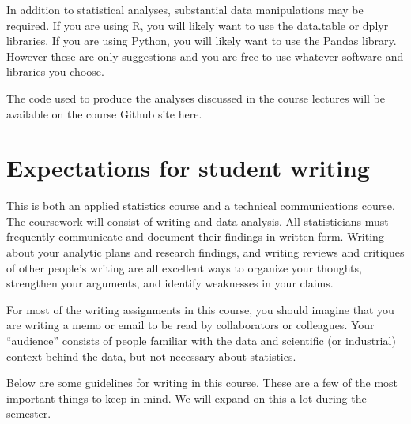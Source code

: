 \documentclass[11pt]{article}
\begin{document}
In addition to statistical analyses, substantial data manipulations may be required. If you are using R, you will likely want to use the data.table or dplyr libraries. If you are using Python, you will likely want to use the Pandas library. However these are only suggestions and you are free to use whatever software and libraries you choose.

The code used to produce the analyses discussed in the course lectures will be available on the course Github site here.

\section*{Expectations for student writing}

This is both an applied statistics course and a technical communications course. The coursework will consist of writing and data analysis. All statisticians must frequently communicate and document their findings in written form. Writing about your analytic plans and research findings, and writing reviews and critiques of other people’s writing are all excellent ways to organize your thoughts, strengthen your arguments, and identify weaknesses in your claims.

For most of the writing assignments in this course, you should imagine that you are writing a memo or email to be read by collaborators or colleagues. Your “audience” consists of people familiar with the data and scientific (or industrial) context behind the data, but not necessary about statistics.

Below are some guidelines for writing in this course. These are a few of the most important things to keep in mind. We will expand on this a lot during the semester.
\end{document}
